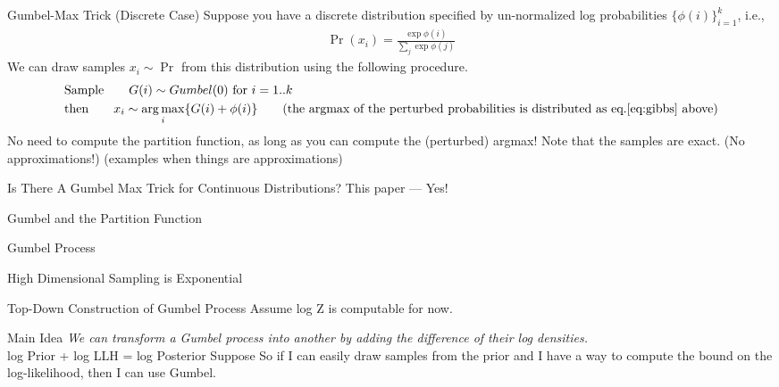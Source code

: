 \begin{frame}{Gumbel-Max Trick (Discrete Case)}
  Suppose you have a discrete distribution specified by un-normalized log probabilities $\{\phi(i)\}_{i=1}^{k}$, i.e.,
  \begin{align}
    \Pr(x_i) = \frac{\exp\phi(i)}{\sum_j\exp\phi(j)} \label{eq:gibbs}
  \end{align}
  We can draw samples $x_i \sim \Pr$ from this distribution using the following procedure.
  \begin{align*}
    & \text{Sample} \qquad G(i) \sim Gumbel(0) \text{ for } i=1..k\\
    & \text{then} \qquad x_i \sim \argmax_i \{G(i) +\phi(i)\} \tag{the argmax of the perturbed probabilities is distributed as eq.\ref{eq:gibbs} above}
  \end{align*}
  No need to compute the partition function, as long as you can compute the (perturbed) argmax!
  Note that the samples are exact. (No approximations!) (examples when things are approximations)
\end{frame}

\begin{frame}{Is There A Gumbel Max Trick for Continuous Distributions?}
  This paper --- Yes!
\end{frame}

\begin{frame}{Gumbel and the Partition Function}
  
\end{frame}

\begin{frame}{Gumbel Process}
\end{frame}

\begin{frame}{High Dimensional Sampling is Exponential}

\end{frame}

\begin{frame}{Top-Down Construction of Gumbel Process}
  Assume log Z is computable for now.
\end{frame}

\begin{frame}{Main Idea}
  \emph{We can transform a Gumbel process into another by adding the difference of their log densities.} \\
  log Prior + log LLH = log Posterior
  Suppose
  So if I can easily draw samples from the prior and I have a way to compute the bound on the log-likelihood, then I can use Gumbel.
\end{frame}

